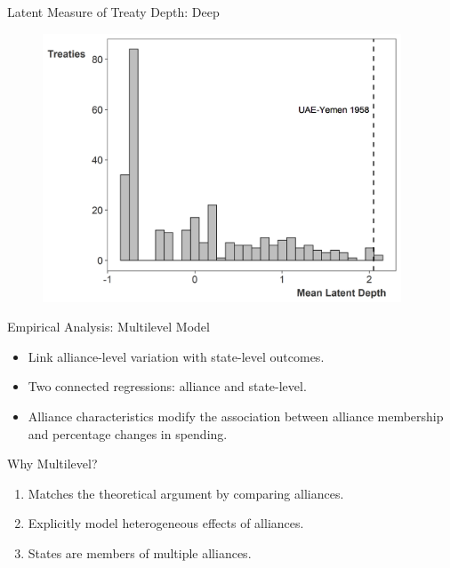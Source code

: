 \documentclass[12pt]{beamer}
\begin{document}

\begin{frame}{Latent Measure of Treaty Depth: Deep}

\begin{figure}[htbp]
	\centering
		\includegraphics[width=0.95\textwidth]{ld-hist-deep.png}
\end{figure}


\end{frame} 



\begin{frame}{Empirical Analysis: Multilevel Model}

\begin{itemize} 
\item Link alliance-level variation with state-level outcomes. 
\pause
\item Two connected regressions: alliance and state-level. 
\pause 
\item Alliance characteristics modify the association between alliance membership and percentage changes in spending.  
\end{itemize} 

\end{frame} 



\begin{frame}{Why Multilevel?}

\begin{enumerate} 
\item Matches the theoretical argument by comparing alliances. 
\pause
\item Explicitly model heterogeneous effects of alliances. 
\pause
\item States are members of multiple alliances. 
\end{enumerate} 

\end{frame} 
\end{document}
